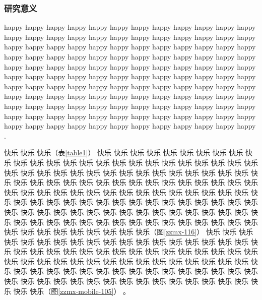 
\subsubsection{研究意义}

\justifying
\indent\setlength{\parindent}{2em}%

happy happy happy happy happy happy happy happy happy happy happy happy happy happy happy happy happy happy happy happy happy happy happy happy happy happy happy happy happy happy happy happy happy happy happy happy happy happy happy happy happy happy happy happy happy happy happy happy happy happy happy happy happy happy happy happy happy happy happy happy happy happy happy happy happy happy happy happy happy happy happy happy happy happy happy happy happy happy happy happy happy happy happy happy happy happy happy happy happy happy happy happy happy happy happy happy happy happy happy happy happy happy happy happy happy happy happy happy happy happy happy happy happy happy happy happy happy happy happy happy happy happy happy happy happy happy happy happy happy happy happy happy \cite{John1997}.

快乐 快乐 快乐（表\ref{table1}） 快乐 快乐 快乐 快乐 快乐 快乐 快乐 快乐 快乐 快乐 快乐 快乐 快乐 快乐 快乐 快乐 快乐 快乐 快乐 快乐 快乐 快乐 快乐 快乐 快乐 快乐 快乐 快乐 快乐 快乐 快乐 快乐 快乐 快乐 快乐 快乐 快乐 快乐 快乐 快乐 快乐 快乐 快乐 快乐 快乐 快乐 快乐 快乐 快乐 快乐 快乐 快乐 快乐 快乐 快乐 快乐 快乐 快乐 快乐 快乐 快乐 快乐 快乐 快乐 快乐 快乐 快乐 快乐 快乐 快乐 快乐 快乐 快乐 快乐 快乐 快乐 快乐 快乐 快乐 快乐 快乐 快乐 快乐 快乐 快乐 快乐 快乐 快乐 快乐 快乐 快乐 快乐 快乐 快乐 快乐 快乐 快乐 快乐 快乐 快乐 快乐 快乐 快乐 快乐 快乐 快乐 快乐 快乐 快乐 快乐 快乐 快乐 快乐 快乐 快乐 快乐 快乐 快乐 快乐 快乐 快乐 快乐 快乐 快乐 快乐 快乐 快乐（图\ref{zzmx-116}） 快乐 快乐 快乐 快乐 快乐 快乐 快乐 快乐 快乐 快乐 快乐 快乐 快乐 快乐 快乐 快乐 快乐 快乐 快乐 快乐 快乐 快乐 快乐 快乐 快乐 快乐 快乐 快乐 快乐 快乐 快乐 快乐 快乐 快乐 快乐 快乐 快乐 快乐 快乐 快乐 快乐 快乐 快乐 快乐 快乐 快乐 快乐 快乐 快乐 快乐 快乐 快乐 快乐 快乐 快乐 快乐 快乐 快乐 快乐 快乐 快乐 快乐 快乐 快乐 快乐 快乐 快乐 快乐 快乐 快乐 快乐 快乐 快乐 快乐 快乐 快乐 快乐 快乐 快乐 快乐 快乐 快乐 快乐（图\ref{zzmx-mobile-105}） 。



